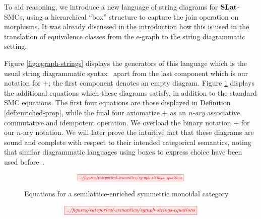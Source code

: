 To aid reasoning, we introduce a new language of string diagrams for $\mathbf{SLat}$-SMCs, using a hierarchical ``box'' structure to capture the join operation on morphisms.  It was already discussed in the introduction how this is  used in the translation of equivalence classes from the e-graph to the string diagrammatic setting. 

Figure \ref{fig:egraph-strings} displays the generators of this language which is the usual string diagrammatic syntax~\cite{Selinger_2010} apart from the last component which is our notation for $+$; the first component denotes an empty diagram. 
Figure \ref{fig:string-equations} displays the additional equations which these diagrams satisfy, in addition to the standard SMC equations. 
The first four equations are those displayed in Definition \ref{def:enriched-prop},  while the final four axiomatize $+$ as an \textit{n-ary} associative, commutative and idempotent operation.  We overload the binary notation $+$ for our $n$-ary notation.  
We will later prove the intuitive fact that these diagrams are sound and complete with respect to their intended categorical semantics, noting that similar diagrammatic languages using boxes to express choice have been used before~\cite{duncan_generalised_2009}. 

\ifdefined \ONECOLUMN
\begin{figure}
	\[  
		\scalebox{0.6}{
		\tikzfig{../figures/categorical-semantics/egraph-strings-equations}
		}
	\]
	\caption{Equations for a  semilattice-enriched symmetric monoidal category}
	\label{fig:string-equations}
	\end{figure}
\else
\begin{figure*}
\[  
    \scalebox{0.75}{
	\tikzfig{../figures/categorical-semantics/egraph-strings-equations}
    }
\]
\caption{Equations for a  semilattice-enriched symmetric monoidal category}
\label{fig:string-equations}
\end{figure*}
\fi